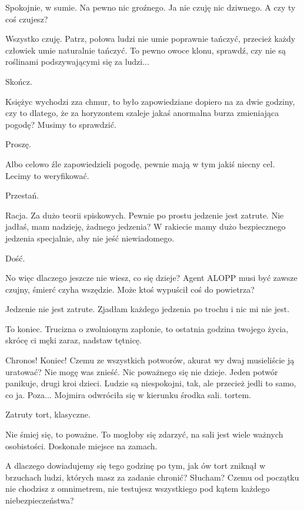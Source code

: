 \ds{} Spokojnie, w sumie. Na pewno nic groźnego. Ja nie czuję nic dziwnego. A czy ty coś czujesz? \de{}

\ds{} Wszystko czuję. Patrz, połowa ludzi nie umie poprawnie tańczyć, przecież każdy człowiek umie naturalnie tańczyć.
To pewno owoce klonu, sprawdź, czy nie są roślinami podszywającymi się za ludzi... \de{}

\ds{} Skończ. \de{}

\ds{} Księżyc wychodzi zza chmur, to było zapowiedziane dopiero na za dwie godziny, czy to dlatego, że za horyzontem szaleje jakaś anormalna burza zmieniająca pogodę? Musimy to sprawdzić. \de{}

\ds{} Proszę. \de{}

\ds{} Albo celowo źle zapowiedzieli pogodę, pewnie mają w tym jakiś niecny cel. Lecimy to weryfikować. \de{}

\ds{} Przestań. \de{}

\ds{} Racja. Za dużo teorii spiskowych. Pewnie po prostu jedzenie jest zatrute. Nie jadłaś, mam nadzieję, żadnego jedzenia? 
W rakiecie mamy dużo bezpiecznego jedzenia specjalnie, aby nie jeść niewiadomego. \de{}

\ds{} Dość. 

\ds{} No więc dlaczego jeszcze nie wiesz, co się dzieje? 
Agent ALOPP musi być zawsze czujny, śmierć czyha wszędzie. Może ktoś wypuścił coś do powietrza? \de{}

\ds{} Jedzenie nie jest zatrute. Zjadłam każdego jedzenia po trochu i nic mi nie jest. \de{}

\ds{} To koniec. Trucizna o zwolnionym zapłonie, to ostatnia godzina twojego życia, skrócę ci męki zaraz, nadstaw tętnicę. \de{}

\ds{} Chronos! Koniec! Czemu ze wszystkich potworów, akurat wy dwaj musieliście ją uratować? Nie mogę was znieść. Nic poważnego się nie dzieje. 
Jeden potwór panikuje, drugi kroi dzieci.
Ludzie są niespokojni, tak, ale przecież jedli to samo, co ja.
Poza... \dm{} Mojmira odwróciła się w kierunku środka sali. \dm{} tortem. \de{}

\ds{} Zatruty tort, klasyczne. \de{}

\ds{} Nie śmiej się, to poważne. To mogłoby się zdarzyć, na sali jest wiele ważnych osobistości. Doskonałe miejsce na zamach. \de{}

\ds{} A dlaczego dowiadujemy się tego godzinę po tym, jak ów tort zniknął w brzuchach ludzi, których masz za zadanie chronić? Słucham? 
Czemu od początku nie chodzisz z omnimetrem, nie testujesz wszystkiego pod kątem każdego niebezpieczeństwa? \de{}

